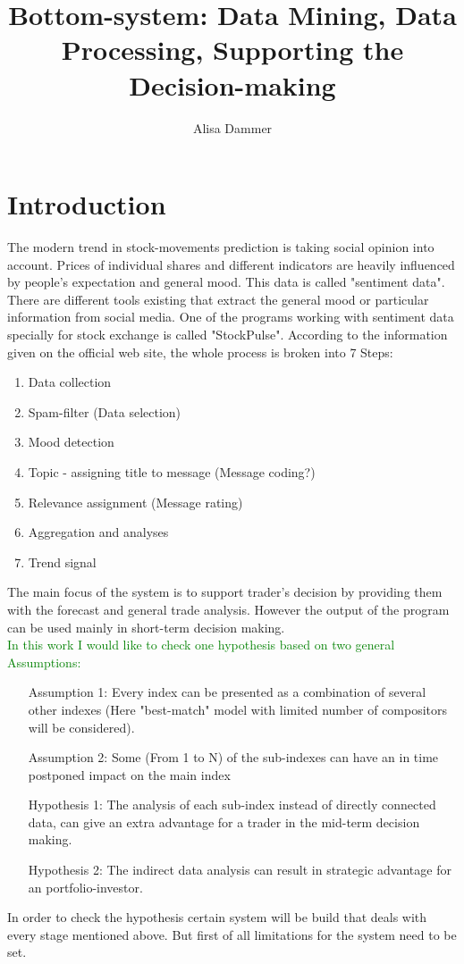 \documentclass[11pt]{article}
\title{\textbf{Bottom-system: Data Mining, Data Processing, Supporting the Decision-making}}
\author{Alisa Dammer}
\begin{document}
\maketitle

\section{Introduction}
The modern trend in stock-movements prediction is taking social opinion into account. Prices of individual shares and different indicators are heavily influenced by people's expectation and general mood. This data is called "sentiment data". There are different tools existing that extract the general mood or particular information from social media.
One of the programs working with sentiment data specially for stock exchange is called "StockPulse". According to the information given on the official web site, the whole process is broken into 7 Steps:\\
\begin{enumerate}
	\item Data collection
	\item Spam-filter (Data selection)
	\item Mood detection
	\item Topic - assigning title to message (Message coding?)
	\item Relevance assignment (Message rating)
	\item Aggregation and analyses
	\item Trend signal
\end{enumerate}
The main focus of the system is to support trader's decision by providing them with the forecast and general trade analysis. However the output of the program can be used mainly in short-term decision making.\\
\textcolor{green}{In this work I would like to check one hypothesis based on two general Assumptions: }
\begin{enumerate}

	\item[Assumption 1:] Every index can be presented as a combination of several other indexes (Here "best-match" model with limited number of compositors will be considered).
	\item[Assumption 2:] Some (From 1 to N) of the sub-indexes can have an in time postponed impact on the main index
	\item[Hypothesis 1:] The analysis of each sub-index instead of directly connected data, can give an extra advantage for a trader in the mid-term decision making.
	\item[Hypothesis 2:] The indirect data analysis can result in strategic advantage for an portfolio-investor.
\end{enumerate}
In order to check the hypothesis certain system will be build that deals with every stage mentioned above. But first of all limitations for the system need to be set.\\
\end{document}

